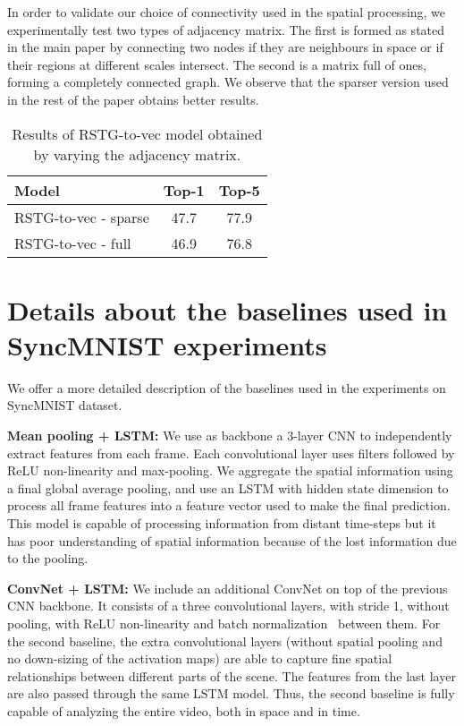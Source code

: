 \documentclass{article}
\begin{document}
In order to validate our choice of connectivity used in the spatial processing, we experimentally test two types of adjacency matrix. The first is formed as stated in the main paper by connecting two nodes if they are neighbours in space or if their regions at different scales intersect. The second is a matrix full of ones, forming a completely connected graph.
We observe that the sparser version used in the rest of the paper obtains better results.



    \begin{table}[H]
        \caption{Results of RSTG-to-vec model obtained by varying the adjacency matrix.}
        \vspace{2mm}
        \centering
        \fontsize{9}{10}\selectfont
        \begin{tabular}{lcc}
            \toprule
            Model & Top-1  & Top-5 \\\midrule
            \midrule
            RSTG-to-vec - sparse   & 47.7 & 77.9 \\RSTG-to-vec - full   & 46.9 & 76.8 \\

            \bottomrule
        \end{tabular}
        \label{tab:ablation}
        \end{table}


\section{Details about the baselines used in SyncMNIST experiments}

We offer a more detailed description of the baselines used in the experiments on SyncMNIST dataset.

\textbf{Mean pooling + LSTM:} We use as backbone a 3-layer CNN to independently extract features from each frame. Each convolutional layer uses   filters followed by ReLU non-linearity and  max-pooling. We aggregate the spatial information using a final global average pooling, and use an LSTM with  hidden state dimension to process all frame features into a feature vector used to make the final prediction. This model is capable of processing information from distant time-steps but it has poor understanding of spatial information because of the lost information due to the pooling.

\textbf{ConvNet + LSTM:} We include an additional ConvNet on top of the previous CNN backbone. It consists of a three convolutional layers, with stride 1, without pooling, with ReLU non-linearity and batch normalization~\cite{pmlr-v37-ioffe15} between them. For the second baseline, the extra convolutional layers (without spatial pooling and no down-sizing of the activation maps) are able to capture fine spatial relationships between different parts of the scene. The features from the last layer are also passed through the same LSTM model. Thus, the second baseline is fully capable of analyzing the entire video, both in space and in time.
\end{document}
